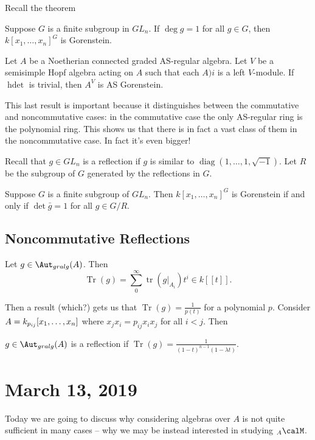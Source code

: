 \documentclass[12pt]{article}
\let\tilde\relax
\newcommand*{\tilde}[1]{\widetilde{#1}}
\begin{document}
Recall the theorem
\begin{thm}[Watanabe]
	Suppose $G$ is a finite subgroup in $GL_n$. If $\deg g=1$ for all $g\in G$, then $k[x_1,\dots,x_n]^G$ is Gorenstein.
\end{thm}
\begin{thm}
	Let $A$ be a Noetherian connected graded AS-regular algebra. Let $V$ be a semisimple Hopf algebra acting on 
	$A$ such that each $A)i$ is a left $V$-module. If $\operatorname{hdet}$ is trivial, then $A^V$ is AS Gorenstein.
\end{thm}
\begin{rmk}
	This last result is important because it distinguishes between the commutative and noncommutative cases: in the commutative
	case the only AS-regular ring is the polynomial ring. This shows us that there is in fact a vast class of them 
	in the noncommutative case. In fact it's even bigger!
\end{rmk}
Recall that $g\in GL_n$ is a reflection if $g$ is similar to $\operatorname{diag}(1,\dots,1,\sqrt{-1})$. Let $R$ be the subgroup of $G$ generated
by the reflections in $G$. 
\begin{thm}[Watanabe II]
	Suppose $G$ is a finite subgroup of $GL_n$. Then $k[x_1,\dots,x_n]^G$ is Gorenstein if and only if
	$\det \bar g=1$ for all $g\in G/R$.
\end{thm}

\subsection{Noncommutative Reflections}
\begin{defn}
	Let $g\in\Aut_{gralg}(A)$. Then
	\[\operatorname{Tr}(g)=\sum_0^\infty \operatorname{tr}(g|_{A_i})t^i\in k[[t]].\]
\end{defn}
Then a result (which?) gets us that $\operatorname{Tr}(g)=\frac{1}{p(t)}$ for a polynomial $p$.
Consider $\tilde A=k_{p_{ij}}[x_1,\dots,x_n]$ where $x_jx_i=p_{ij}x_ix_j$ for all $i<j$. Then 
\begin{defn}
	$g\in\Aut_{gralg}(\tilde A)$ is a reflection if $\operatorname{Tr}(g)=\frac{1}{(1-t)^{n-1}(1-\lambda t)}$.
\end{defn}

\section{March 13, 2019}
Today we are going to discuss why considering algebras over $A$ is not quite sufficient in many cases --
why we may be instead interested in studying $_A\calM$.
\end{document}
